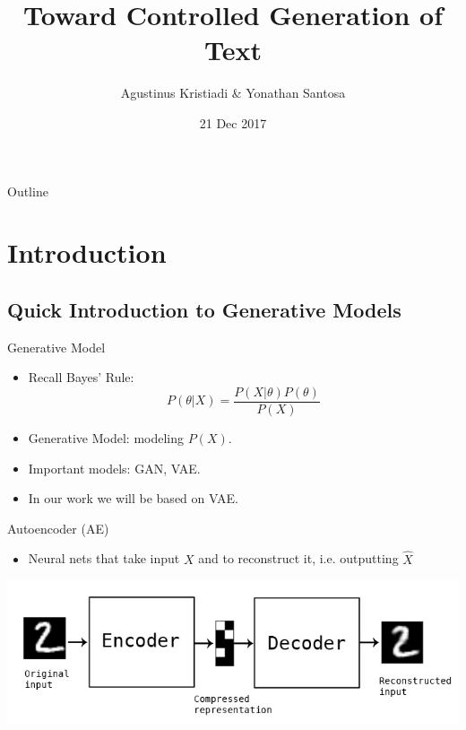 \documentclass{beamer}
\title[Toward Controlled Generation of Text]{Toward Controlled Generation of Text}
\author{Agustinus Kristiadi & Yonathan Santosa}
\institute{University of Bonn}
\date{21 Dec 2017}
\begin{document}
    \begin{frame}
      \titlepage
    \end{frame}

    \begin{frame}{Outline}
     \tableofcontents
    \end{frame}


    \section{Introduction}

    \subsection{Quick Introduction to Generative Models}

    \begin{frame}{Generative Model}

    \begin{itemize}
        \item Recall Bayes' Rule:
        $$P(\theta \vert X) = \frac{P(X \vert \theta) P(\theta)}{P(X)}$$
        \item Generative Model: modeling $P(X)$.
        \item Important models: GAN, VAE.
        \item In our work we will be based on VAE.
    \end{itemize}

    \end{frame}

    \begin{frame}{Autoencoder (AE)}

      \begin{itemize}
          \item Neural nets that take input $X$ and to reconstruct it, i.e. outputting $\hat{X}$

      \end{itemize}

      \includegraphics{ae}

    \end{frame}
\end{document}
